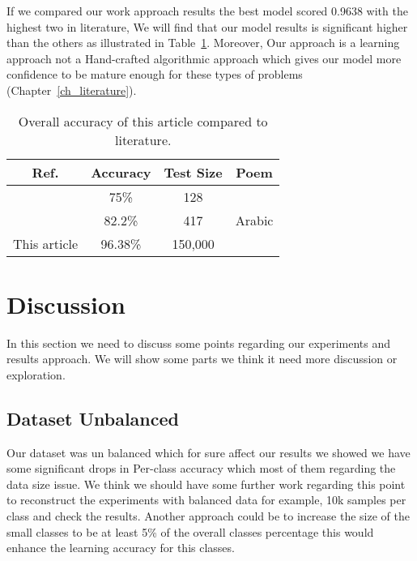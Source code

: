 If we compared our work approach results the best model scored 0.9638 with the highest two in literature, We will find that our model results is significant higher than the others as illustrated in Table~\ref{tab:summ-results}. Moreover, Our approach is a learning approach not a Hand-crafted algorithmic approach which gives our model more confidence to be mature enough for these types of problems (Chapter~\ref{ch_literature}).

\begin{table}[!tb]
  \centering
  \begin{tabular}{c c c c}
    \toprule
    \textbf{Ref.}& \textbf{Accuracy}& \textbf{Test Size} & \textbf{Poem}\\
    \midrule
    \cite{Alnagdawi2013FindingArabicPoemMeter}   & 75\%     & 128     & \multirow{3}{*}{Arabic}\\
    \cite{Abuata2016RuleBasedAlgorithmFor}      & 82.2\%   & 417     & \\
    This article   & 96.38\%  & 150,000 & \\
    \bottomrule
  \end{tabular}
  \caption{Overall accuracy of this article compared to literature.}\label{tab:summ-results}
\end{table}


\newpage
\section{Discussion}\label{sec_discussion}

In this section we need to discuss some points regarding our experiments and results approach. We will show some parts we think it need more discussion or exploration.


\subsection{Dataset Unbalanced}

Our dataset was un balanced which for sure affect our results we showed we have some significant drops in Per-class accuracy which most of them regarding the data size issue. We think we should have some further work regarding this point to reconstruct the experiments with balanced data for example, 10k samples per class and check the results. Another approach could be to increase the size of the small classes to be at least 5\% of the overall classes percentage this would enhance the learning accuracy for this classes.
  
